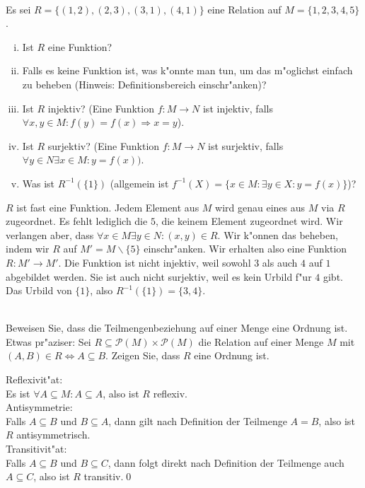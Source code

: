 \\
Es sei $R=\{(1,2),(2,3),(3,1),(4,1)\}$ eine Relation auf $M=\{1,2,3,4,5\}$.
\begin{enumerate}[(i)]
    \item Ist $R$ eine Funktion?
    \item Falls es keine Funktion ist, was k"onnte man tun, um das m"oglichst einfach zu beheben (Hinweis: Definitionsbereich einschr"anken)?
    \item Ist $R$ injektiv? (Eine Funktion $f:M\to N$ ist injektiv, falls $\forall x,y\in M:f(y)=f(x)\Rightarrow x=y$).
    \item Ist $R$ surjektiv? (Eine Funktion $f:M\to N$ ist surjektiv, falls $\forall y\in N\exists x\in M:y=f(x))$.
    \item Was ist $R^{-1}(\{1\})$ (allgemein ist $f^{-1}(X)=\{x\in M:\exists y\in X:y=f(x)\}$)?
\end{enumerate}

\begin{loesung}
$R$ ist fast eine Funktion. Jedem Element aus $M$ wird genau eines aus $M$ via $R$ zugeordnet. Es fehlt lediglich die $5$, die keinem Element zugeordnet wird. Wir verlangen aber, dass $\forall x\in M\exists y\in N:(x,y)\in R$.
Wir k"onnen das beheben, indem wir $R$ auf $M'=M\backslash\{5\}$ einschr"anken. Wir erhalten also eine Funktion $R:M'\to M'$.
Die Funktion ist nicht injektiv, weil sowohl $3$ als auch $4$ auf $1$ abgebildet werden. Sie ist auch nicht surjektiv, weil es kein Urbild f"ur $4$ gibt.
Das Urbild von $\{1\}$, also $R^{-1}(\{1\})=\{3,4\}$.
\end{loesung}

\\
Beweisen Sie, dass die Teilmengenbeziehung auf einer Menge eine Ordnung ist. Etwas pr"aziser: Sei $R\subseteq \mathscr{P}(M)\times\mathscr{P}(M)$ die Relation auf einer Menge $M$ mit $(A,B)\in R\Leftrightarrow A\subseteq B$. Zeigen Sie, dass $R$ eine Ordnung ist.

\begin{loesung}
Reflexivit"at:\\
Es ist $\forall A\subseteq M:A\subseteq A$, also ist $R$ reflexiv.\\
Antisymmetrie:\\
Falls $A\subseteq B$ und $B\subseteq A$, dann gilt nach Definition der Teilmenge $A=B$, also ist $R$ antisymmetrisch.\\
Transitivit"at:\\
Falls $A\subseteq B$ und $B\subseteq C$, dann folgt direkt nach Definition der Teilmenge auch $A\subseteq C$, also ist $R$ transitiv.\qed
\end{loesung}

